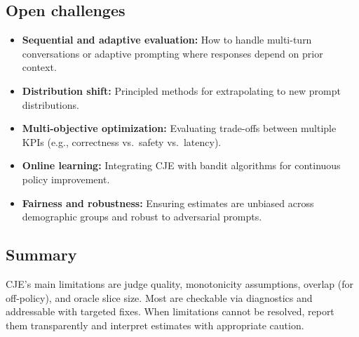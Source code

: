 \subsection{Open challenges}

\begin{itemize}
\item \textbf{Sequential and adaptive evaluation:} How to handle multi-turn conversations or adaptive prompting where responses depend on prior context.
\item \textbf{Distribution shift:} Principled methods for extrapolating to new prompt distributions.
\item \textbf{Multi-objective optimization:} Evaluating trade-offs between multiple KPIs (e.g., correctness vs.\ safety vs.\ latency).
\item \textbf{Online learning:} Integrating CJE with bandit algorithms for continuous policy improvement.
\item \textbf{Fairness and robustness:} Ensuring estimates are unbiased across demographic groups and robust to adversarial prompts.
\end{itemize}

\subsection{Summary}

CJE's main limitations are judge quality, monotonicity assumptions, overlap (for off-policy), and oracle slice size. Most are checkable via diagnostics and addressable with targeted fixes. When limitations cannot be resolved, report them transparently and interpret estimates with appropriate caution.
